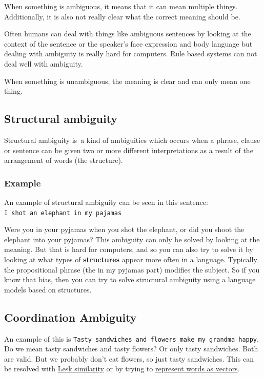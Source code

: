 \documentclass[
  11pt,
  british,
]{article}
\begin{document}
When something is ambiguous, it means that it can mean multiple things.
Additionally, it is also not really clear what the correct meaning
should be.

Often humans can deal with things like ambiguous sentences by looking at
the context of the sentence or the speaker's face expression and body
language but dealing with ambiguity is really hard for computers. Rule
based systems can not deal well with ambiguity.

When something is unambiguous, the meaning is clear and can only mean
one thing.

\hypertarget{structural-ambiguity}{%
\subsection{Structural ambiguity}\label{structural-ambiguity}}

Structural ambiguity is~a kind of ambiguities which occurs when a
phrase, clause or sentence can be given two or more different
interpretations as a result of the arrangement of words (the structure).

\hypertarget{example-7}{%
\subsubsection{Example}\label{example-7}}

An example of structural ambiguity can be seen in this sentence:
\texttt{I\ shot\ an\ elephant\ in\ my\ pajamas}

Were you in your pyjamas when you shot the elephant, or did you shoot
the elephant into your pyjamas? This ambiguity can only be solved by
looking at the meaning. But that is hard for computers, and so you can
also try to solve it by looking at what types of \textbf{structures}
appear more often in a language. Typically the propositional phrase (the
in my pyjamas part) modifies the subject. So if you know that bias, then
you can try to solve structural ambiguity using a language models based
on structures.

\hypertarget{coordination-ambiguity}{%
\subsection{Coordination Ambiguity}\label{coordination-ambiguity}}

An example of this is
\texttt{Tasty\ sandwiches\ and\ flowers\ make\ my\ grandma\ happy}. Do
we mean tasty sandwiches and tasty flowers? Or only tasty sandwiches.
Both are valid. But we probably don't eat flowers, so just tasty
sandwiches. This can be resolved with \href{../Data/Thesaurus.md}{Lesk
similarity} or by trying to
\href{../Semantic-Similarity/Vector\%20semantics.md}{represent words as
vectors}.
\end{document}
